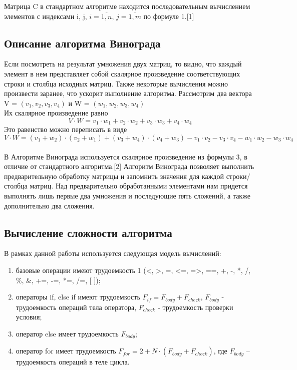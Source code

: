 \documentclass[a4paper,12pt]{article}
\begin{document}
	
	Матрица C в стандартном алгоритме находится последовательным вычислением элементов с индексами i, j, $i = \overline{1,n}$, $j = \overline{1,m}$ по формуле 1.[1]
	\subsection{Описание алгоритма Винограда}
	\hfill
	
	Если посмотреть на результат умножения двух матриц, то видно,
	что каждый элемент в нем представляет собой скалярное произведение
	соответствующих строки и столбца исходных матриц. Также некоторые вычисления можно произвести заранее, что ускорит выполнение алгоритма.
	Рассмотрим два вектора V = $(v_{1}, v_{2}, v_{3}, v_{4})$ и W = $(w_{1}, w_{2}, w_{3}, w_{4})$\\
	Их скалярное произведение равно\\
	\begin{equation}
		V \cdot W=v_1 \cdot w_1 + v_2 \cdot w_2 + v_3 \cdot w_3 + v_4 \cdot w_4 
	\end{equation}
	Это равенство можно переписать в виде\\
	\begin{equation}
		V \cdot W=(v_1 + w_2) \cdot (v_2 + w_1) + (v_3 + w_4) \cdot (v_4 + w_3) - v_1 \cdot v_2 - v_3 \cdot v_4 - w_1 \cdot w_2 - w_3 \cdot w_4
	\end{equation}\\
	В Алгоритме Винограда используется скалярное произведение из формулы 3, в отличие от стандартного алгоритма.[2] Алгоритм Винограда позволяет выполнить предварительную обработку матрицы и запомнить значения для каждой строки/столбца матриц.
	Над предварительно обработанными элементами нам придется выполнять лишь первые два умножения и последующие пять сложений, а также
	дополнительно два сложения.\\
	\subsection{Вычисление сложности алгоритма}
	\hfill
	
	В рамках данной работы используется следующая модель вычислений:\\
	\begin{enumerate}
		\item базовые операции имеют трудоемкость 1 (<, >, =, <=, =>, ==, +, -, *, /, \%, \&, +=, -=, *=, /=,  [ ]);\\
		\item операторы if, else if имеют трудоемкость $F_{if} = F_{body} + F_{cheсk}$,  $F_{body}$ - трудоемкость операций тела оператора,  $F_{cheсk}$ - трудоемкость проверки условия;\\
		\item оператор else имеет трудоемкость $F_{body}$;\\
		\item оператор for имеет трудоемкость  $F_{for} = 2 + N \cdot (F_{body} + F_{cheсk})$, где $F_{body}$ – трудоемкость операций в теле цикла.\\
	\end{enumerate}
\end{document}
